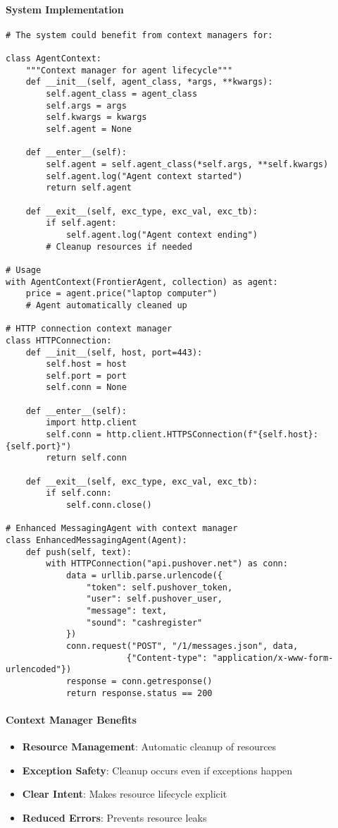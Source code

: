 \paragraph{System Implementation}
\begin{lstlisting}[caption=Context Managers in Agent System (Potential)]
# The system could benefit from context managers for:

class AgentContext:
    """Context manager for agent lifecycle"""
    def __init__(self, agent_class, *args, **kwargs):
        self.agent_class = agent_class
        self.args = args
        self.kwargs = kwargs
        self.agent = None
    
    def __enter__(self):
        self.agent = self.agent_class(*self.args, **self.kwargs)
        self.agent.log("Agent context started")
        return self.agent
    
    def __exit__(self, exc_type, exc_val, exc_tb):
        if self.agent:
            self.agent.log("Agent context ending")
        # Cleanup resources if needed

# Usage
with AgentContext(FrontierAgent, collection) as agent:
    price = agent.price("laptop computer")
    # Agent automatically cleaned up

# HTTP connection context manager
class HTTPConnection:
    def __init__(self, host, port=443):
        self.host = host
        self.port = port
        self.conn = None
    
    def __enter__(self):
        import http.client
        self.conn = http.client.HTTPSConnection(f"{self.host}:{self.port}")
        return self.conn
    
    def __exit__(self, exc_type, exc_val, exc_tb):
        if self.conn:
            self.conn.close()

# Enhanced MessagingAgent with context manager
class EnhancedMessagingAgent(Agent):
    def push(self, text):
        with HTTPConnection("api.pushover.net") as conn:
            data = urllib.parse.urlencode({
                "token": self.pushover_token,
                "user": self.pushover_user,
                "message": text,
                "sound": "cashregister"
            })
            conn.request("POST", "/1/messages.json", data,
                        {"Content-type": "application/x-www-form-urlencoded"})
            response = conn.getresponse()
            return response.status == 200
\end{lstlisting}

\paragraph{Context Manager Benefits}
\begin{itemize}
\item \textbf{Resource Management}: Automatic cleanup of resources
\item \textbf{Exception Safety}: Cleanup occurs even if exceptions happen
\item \textbf{Clear Intent}: Makes resource lifecycle explicit
\item \textbf{Reduced Errors}: Prevents resource leaks
\end{itemize}

